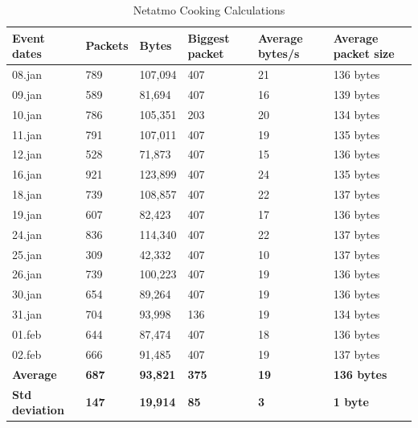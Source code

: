 \begin{table}[!ht]
    \centering
    \caption{Netatmo Cooking Calculations}
    \begin{tabular}{|l|l|l|l|l|l|}
    \hline
        \textbf{Event dates} & \textbf{Packets} & \textbf{Bytes} & \textbf{Biggest packet} & \textbf{Average bytes/s} & \textbf{Average packet size}  \\ \hline
        08.jan & 789 & 107,094 & 407 & 21 & 136 bytes \\ \hline
        09.jan & 589 & 81,694 & 407 & 16 & 139 bytes \\ \hline
        10.jan & 786 & 105,351 & 203 & 20 & 134 bytes \\ \hline
        11.jan & 791 & 107,011 & 407 & 19 & 135 bytes \\ \hline
        12.jan & 528 & 71,873 & 407 & 15 & 136  bytes\\ \hline
        16.jan & 921 & 123,899 & 407 & 24 & 135 bytes \\ \hline
        18.jan & 739 & 108,857 & 407 & 22 & 137 bytes  \\ \hline
        19.jan & 607 & 82,423 & 407 & 17 & 136 bytes \\ \hline
        24.jan & 836 & 114,340 & 407 & 22 & 137 bytes  \\ \hline
        25.jan & 309 & 42,332 & 407 & 10 & 137 bytes \\ \hline
        26.jan & 739 & 100,223 & 407 & 19 & 136 bytes  \\ \hline
        30.jan & 654 & 89,264 & 407 & 19 & 136 bytes \\ \hline
        31.jan & 704 & 93,998 & 136 & 19 & 134 bytes \\ \hline
        01.feb & 644 & 87,474 & 407 & 18 & 136 bytes \\ \hline
        02.feb & 666 & 91,485 & 407 & 19 & 137 bytes \\ \hline
        \textbf{Average} &  \textbf{687}  &  \textbf{93,821}  &  \textbf{375}  &  \textbf{19}  &  \textbf{136 bytes} \\ \hline
        \textbf{Std deviation} &  \textbf{147}  & \textbf{19,914}  &  \textbf{85}  &  \textbf{3}  &  \textbf{1 byte} \\ \hline
    \end{tabular}
    \label{tab:NetatmoCookingCalculations}
\end{table}

